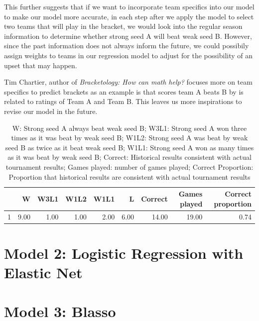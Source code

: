\documentclass{article} %
\begin{document}
This further suggests that if we want to incorporate team specifics into our model to make our model more accurate, in each step after we apply the model to select two teams that will play in the bracket, we would look into the regular season information to determine whether strong seed A will beat weak seed B. However, since the past information does not always inform the future, we could possibily assign weights to teams in our regression model to adjust for the possibility of an upset that may happen. 

Tim Chartier, author of \textit{Bracketology: How can math help?} focuses more on team specifics to predict brackets as an example is that scores team A beats B by is related to ratings of Team A and Team B. This leaves us more inspirations to revise our model in the future. 

\begin{table}[ht]
\centering
\begin{tabular}{rrrrrrrrr}
  \hline
 & W & W3L1 & W1L2 & W1L1 & L & Correct & Games played & Correct proportion \\ 
  \hline
1 & 9.00 & 1.00 & 1.00 & 2.00 & 6.00 & 14.00 & 19.00 & 0.74 \\ 
   \hline
\end{tabular}

\caption{W: Strong seed A always beat weak seed B; W3L1: Strong seed A won three times as it was beat by weak seed B; W1L2: Strong seed A was beat by weak seed B as twice as it beat weak seed B; W1L1: Strong seed A won as many times as it was beat by weak seed B; Correct: Historical results consistent with actual tournament results; Games played: number of games played; Correct Proportion: Proportion that historical results are consistent with actual tournament results}
\end{table}









\section{Model 2: Logistic Regression with Elastic Net}
\section{Model 3: Blasso}
\end{document}
